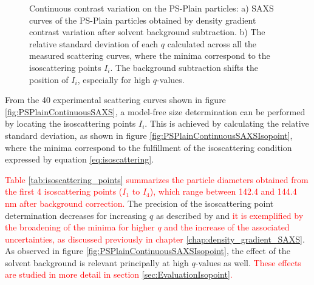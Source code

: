 \begin{figure*}%
	\centering
                \qquad
	\caption[Continuous contrast variation experimental data of the PS-Plain particles.]{Continuous contrast variation on the PS-Plain particles: a) SAXS curves of the PS-Plain particles obtained by density gradient contrast variation after solvent background subtraction. b) The relative standard deviation of each $q$ calculated across all the measured scattering curves, where the minima correspond to the isoscattering points $I_i$. The background subtraction shifts the position of $I_i$, especially for high $q$-values.}
\end{figure*}

From the 40 experimental scattering curves shown in figure \ref{fig:PSPlainContinuousSAXS}, a model-free size determination can be performed by locating the isoscattering points $I_i$. This is achieved by calculating the relative standard deviation, as shown in figure \ref{fig:PSPlainContinuousSAXSIsopoint}, where the minima correspond to the fulfillment of the isoscattering condition expressed by equation \ref{eq:isoscattering}.

\textcolor{red}{Table \ref{tab:isoscattering_points} summarizes the particle diameters obtained from the first 4 isoscattering points ($I_1$ to $I_4$), which range between 142.4 and 144.4 nm after background correction.} The precision of the isoscattering point determination decreases for increasing $q$ as described by \cite{kawaguchi_isoscattering_1992} and \textcolor{red}{it is exemplified by the broadening of the minima for higher $q$ and the increase of the associated uncertainties, as discussed previously in chapter \ref{chap:density_gradient_SAXS}}. As observed in figure \ref{fig:PSPlainContinuousSAXSIsopoint}, the effect of the solvent background is relevant principally at high $q$-values as well. \textcolor{red}{These effects are studied in more detail in section \ref{sec:EvaluationIsopoint}.}

